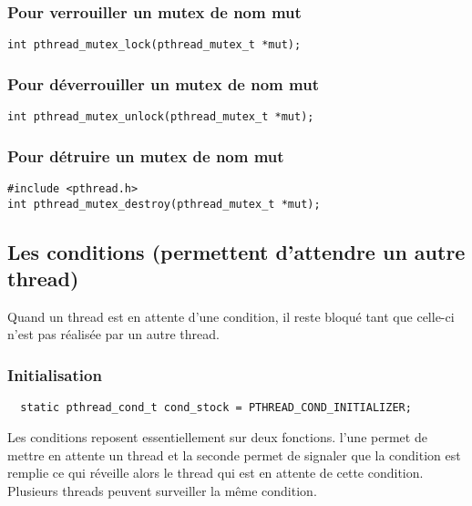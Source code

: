 \documentclass[a4paper]{article}
\begin{document}
\subsubsection{Pour verrouiller un mutex de nom mut}
\begin{lstlisting}
int pthread_mutex_lock(pthread_mutex_t *mut);
\end{lstlisting}


\subsubsection{Pour déverrouiller un mutex de nom mut}
\begin{lstlisting}
int pthread_mutex_unlock(pthread_mutex_t *mut);
\end{lstlisting}
\subsubsection{Pour détruire un mutex de nom mut}
\begin{lstlisting}
#include <pthread.h>
int pthread_mutex_destroy(pthread_mutex_t *mut);
\end{lstlisting}
\subsection{Les conditions (permettent d'attendre un autre thread)}
Quand un thread est en attente d'une condition, il reste bloqué tant que celle-ci n'est pas réalisée par un autre thread.
\subsubsection{Initialisation} %
\begin{lstlisting}
  static pthread_cond_t cond_stock = PTHREAD_COND_INITIALIZER;
\end{lstlisting}
Les conditions reposent essentiellement sur deux fonctions.
l'une permet de mettre en attente un thread et la seconde permet de signaler que la condition est remplie ce qui réveille alors le thread qui est en attente de cette condition.
Plusieurs threads peuvent surveiller la même condition.
\newpage
\end{document}
